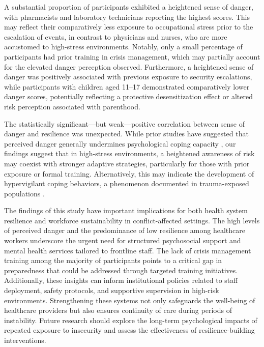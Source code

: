 \documentclass[12pt]{article}
\begin{document}
A substantial proportion of participants exhibited a heightened sense of danger, with pharmacists and laboratory technicians reporting the highest scores. This may reflect their comparatively less exposure to occupational stress prior to the escalation of events, in contrast to physicians and nurses, who are more accustomed to high-stress environments. Notably, only a small percentage of participants had prior training in crisis management, which may partially account for the elevated danger perception observed. Furthermore, a heightened sense of danger was positively associated with previous exposure to security escalations, while participants with children aged 11--17 demonstrated comparatively lower danger scores, potentially reflecting a protective desensitization effect or altered risk perception associated with parenthood.

The statistically significant---but weak---positive correlation between sense of danger and resilience was unexpected. While prior studies have suggested that perceived danger generally undermines psychological coping capacity \cite{tadesse2023exposure}, our findings suggest that in high-stress environments, a heightened awareness of risk may coexist with stronger adaptive strategies, particularly for those with prior exposure or formal training. Alternatively, this may indicate the development of hypervigilant coping behaviors, a phenomenon documented in trauma-exposed populations \cite{stewart2022hypervigilance}.

The findings of this study have important implications for both health system resilience and workforce sustainability in conflict-affected settings. The high levels of perceived danger and the predominance of low resilience among healthcare workers underscore the urgent need for structured psychosocial support and mental health services tailored to frontline staff. The lack of crisis management training among the majority of participants points to a critical gap in preparedness that could be addressed through targeted training initiatives. Additionally, these insights can inform institutional policies related to staff deployment, safety protocols, and supportive supervision in high-risk environments. Strengthening these systems not only safeguards the well-being of healthcare providers but also ensures continuity of care during periods of instability. Future research should explore the long-term psychological impacts of repeated exposure to insecurity and assess the effectiveness of resilience-building interventions.
\end{document}
